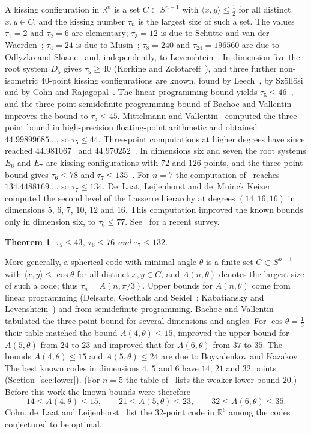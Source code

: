 \documentclass[11pt]{amsart}
\newtheorem{theorem}{Theorem}[section]
\theoremstyle{remark}
\newcommand{\R}{\mathbb{R}}
\begin{document}
A kissing configuration in $\R^n$ is a set $C\subset S^{n-1}$ with $\langle x,y\rangle\le\frac12$ for all distinct $x,y\in C$, and the kissing number $\tau_n$ is the largest size of such a set. The values $\tau_1=2$ and $\tau_2=6$ are elementary; $\tau_3=12$ is due to Sch\"utte and van der Waerden~\cite{SvdW}; $\tau_4=24$ is due to Musin~\cite{Mus}; $\tau_8=240$ and $\tau_{24}=196560$ are due to Odlyzko and Sloane~\cite{OS} and, independently, to Levenshtein~\cite{Lev}.
In dimension five the root system $D_5$ gives $\tau_5\ge40$ (Korkine and Zolotareff~\cite{KZ}), and three further non-isometric $40$-point kissing configurations are known, found by Leech~\cite{Leech}, by Sz\"oll\H{o}si~\cite{Sz} and by Cohn and Rajagopal~\cite{CR}.
The linear programming bound yields $\tau_5\le46$~\cite{OS}, and the three-point semidefinite programming bound of Bachoc and Vallentin~\cite{BV} improves the bound to $\tau_5\le45$. Mittelmann and Vallentin~\cite{MV} computed the three-point bound in high-precision floating-point arithmetic and obtained $44.99899685\ldots$, so $\tau_5\le44$. Three-point computations at higher degrees have since reached $44.981067$~\cite{MOF} and $44.970252$~\cite{LdL}.
In dimensions six and seven the root systems $E_6$ and $E_7$ are kissing configurations with $72$ and $126$ points, and the three-point bound gives $\tau_6\le78$ and $\tau_7\le135$~\cite{BV}. For $n=7$ the computation of~\cite{MV} reaches $134.4488169\ldots$, so $\tau_7\le134$.
De~Laat, Leijenhorst and de~Muinck Keizer~\cite{LLM} computed the second level of the Lasserre hierarchy at degrees $(14,16,16)$ in dimensions $5$, $6$, $7$, $10$, $12$ and $16$. This computation improved the known bounds only in dimension six, to $\tau_6\le77$. See~\cite{Val} for a recent survey.

\begin{theorem}\label{thm:main}
$\tau_5\le 43$, $\tau_6\le76$ and $\tau_7\le132$.
\end{theorem}

More generally, a spherical code with minimal angle $\theta$ is a finite set $C\subset S^{n-1}$ with $\langle x,y\rangle\le\cos\theta$ for all distinct $x,y\in C$, and $A(n,\theta)$ denotes the largest size of such a code; thus $\tau_n=A(n,\pi/3)$. Upper bounds for $A(n,\theta)$ come from linear programming (Delsarte, Goethals and Seidel~\cite{DGS}; Kabatiansky and Levenshtein~\cite{KL}) and from semidefinite programming. Bachoc and Vallentin~\cite{BV} tabulated the three-point bound for several dimensions and angles. For $\cos\theta=\frac13$ their table matched the bound $A(4,\theta)\le15$, improved the upper bound for $A(5,\theta)$ from $24$ to $23$ and improved that for $A(6,\theta)$ from $37$ to $35$. The bounds $A(4,\theta)\le15$ and $A(5,\theta)\le24$ are due to Boyvalenkov and Kazakov~\cite{BK}. The best known codes in dimensions $4$, $5$ and $6$ have $14$, $21$ and $32$ points (Section~\ref{sec:lower}). (For $n=5$ the table of~\cite{BV} lists the weaker lower bound $20$.) Before this work the known bounds were therefore
\[
14\le A(4,\theta)\le 15,\qquad 21\le A(5,\theta)\le 23,\qquad 32\le A(6,\theta)\le 35 .
\]
Cohn, de~Laat and Leijenhorst~\cite[Table~6.1]{CdLL} list the $32$-point code in $\R^6$ among the codes conjectured to be optimal.
\end{document}

